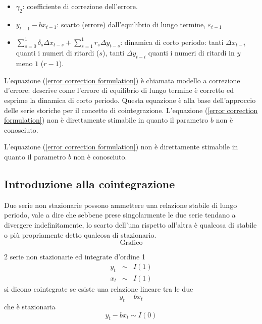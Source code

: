 \documentclass[a4paper]{report}
\newcounter{ese}
\newcounter{def}
\theoremstyle{remark}
\begin{document}
\begin{itemize}
\item $\gamma _{2}$: coefficiente di correzione dell'errore.

\item $y_{t-1}-bx_{t-1}$: scarto (errore) dall'equilibrio di lungo termine, $%
\varepsilon _{t-1}$

\item $\sum_{s=0}^{1}\delta _{s}\Delta x_{t-s}+\sum_{s=1}^{1}r_{s}\Delta
y_{t-s}$: dinamica di corto periodo: tanti $\Delta x_{t-i}$ quanti i numeri
di ritardi ($s$), tanti $\Delta y_{t-i}$ quanti i numeri di ritardi in $y$
meno $1$ ($r-1$).
\end{itemize}

\noindent L'equazione (\ref{error correction formulation}) \`{e} chiamata
modello a correzione d'errore: descrive come l'errore di equilibrio di lungo
termine \`{e} corretto ed esprime la dinamica di corto periodo. Questa
equazione \`{e} alla base dell'approccio delle serie storiche per il
concetto di cointegrazione. L'equazione (\ref{error correction formulation})
non \`{e} direttamente stimabile in quanto il parametro $b$ non \`{e}
conosciuto.

\noindent L'equazione (\ref{error correction formulation}) non \`{e}
direttamente stimabile in quanto il parametro $b$ non \`{e} conosciuto.

\subsection{Introduzione alla cointegrazione}

Due serie non stazionarie possono ammettere una relazione stabile di lungo
periodo, vale a dire che sebbene prese singolarmente le due serie tendano a
divergere indefinitamente, lo scarto dell'una rispetto all'altra \`{e}
qualcosa di stabile o pi\`{u} propriamente detto qualcosa di stazionario.%
\begin{equation*}
\text{Grafico}
\end{equation*}%
\vspace{5cm}

\begin{definition}
2 serie non stazionarie ed integrate d'ordine 1%
\begin{eqnarray*}
y_{t} &\sim &I(1) \\
x_{t} &\sim &I(1)
\end{eqnarray*}%
si dicono cointegrate se esiste una relazione lineare tra le due%
\begin{equation*}
y_{t}-bx_{t}
\end{equation*}%
che \`{e} stazionaria%
\begin{equation*}
y_{t}-bx_{t}\sim I(0)
\end{equation*}
\end{definition}
\end{document}
